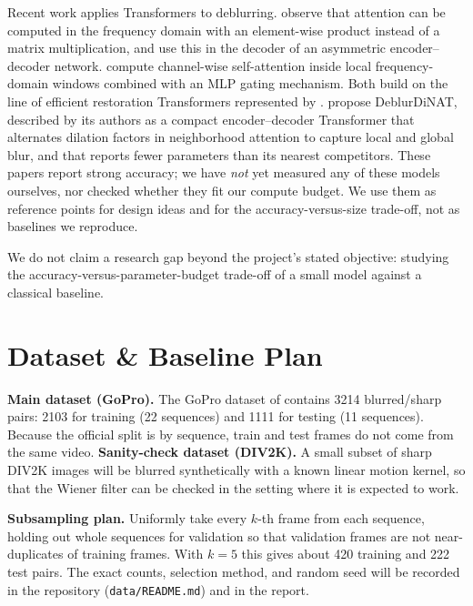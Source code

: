 \documentclass[11pt]{article}
\begin{document}
Recent work applies Transformers to deblurring. \citet{kong2023} observe that attention
can be computed in the frequency domain with an element-wise product instead of a matrix
multiplication, and use this in the decoder of an asymmetric encoder--decoder network.
\citet{mao2024} compute channel-wise self-attention inside local frequency-domain
windows combined with an MLP gating mechanism. Both build on the line of efficient
restoration Transformers represented by \citet{zamir2022}. \citet{liu2024} propose DeblurDiNAT, described by its authors as a compact encoder--decoder
Transformer that alternates dilation factors in neighborhood attention to capture local and global blur,
and that reports fewer parameters than its nearest competitors. These papers report strong
accuracy; we have \emph{not} yet measured any of these models ourselves, nor checked whether
they fit our compute budget. We use them as reference points for design ideas and for the
accuracy-versus-size trade-off, not as baselines we reproduce.

We do not claim a research gap beyond the project's stated objective: studying the
accuracy-versus-parameter-budget trade-off of a small model against a classical baseline.

\section{Dataset \& Baseline Plan}
\label{sec:data}
\textbf{Main dataset (GoPro).} The GoPro dataset of \citet{nah2017} contains 3214 blurred/sharp
pairs: 2103 for training (22 sequences) and 1111 for testing (11 sequences). Because the
official split is by sequence, train and test frames do not come from the same video.
\textbf{Sanity-check dataset (DIV2K).} A small subset of sharp DIV2K images will be blurred
synthetically with a known linear motion kernel, so that the Wiener filter can be checked
in the setting where it is expected to work.

\textbf{Subsampling plan.} Uniformly take every $k$-th frame
from each sequence, holding out whole sequences for validation so that validation frames
are not near-duplicates of training frames. With $k=5$ this gives about 420
training and 222 test pairs. The exact counts, selection method, and random seed will be
recorded in the repository (\texttt{data/README.md}) and in the report.
\end{document}
